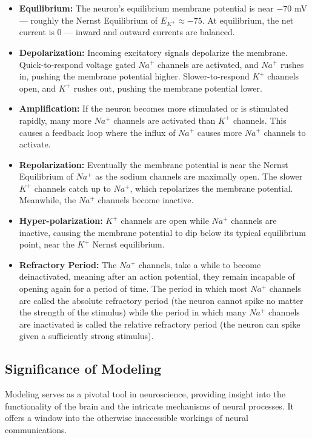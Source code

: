 \documentclass[paper=a4, fontsize=11pt]{scrartcl} %
\numberwithin{equation}{section} %
\numberwithin{figure}{section} %
\numberwithin{table}{section} %
\begin{document}
\begin{itemize}
    \item \textbf{Equilibrium:} The neuron’s equilibrium membrane potential is near \(-70\) mV — roughly the Nernst Equilibrium of \( E_{K^+} \approx -75 \). At equilibrium, the net current is \(0\) — inward and outward currents are balanced.
    \item \textbf{Depolarization:} Incoming excitatory signals depolarize the membrane. Quick-to-respond voltage gated \( Na^+ \) channels are activated, and \( Na^+ \) rushes in, pushing the membrane potential higher. Slower-to-respond \( K^+ \) channels open, and \( K^+ \) rushes out, pushing the membrane potential lower.
    \item \textbf{Amplification:} If the neuron becomes more stimulated or is stimulated rapidly, many more \( Na^+ \) channels are activated than \( K^+ \) channels. This causes a feedback loop where the influx of \( Na^+ \) causes more \( Na^+ \) channels to activate.
    \item \textbf{Repolarization:} Eventually the membrane potential is near the Nernst Equilibrium of \( Na^+ \) as the sodium channels are maximally open. The slower \( K^+ \) channels catch up to \( Na^+ \), which repolarizes the membrane potential. Meanwhile, the \( Na^+ \) channels become inactive.
    \item \textbf{Hyper-polarization:} \( K^+ \) channels are open while \( Na^+ \) channels are inactive, causing the membrane potential to dip below its typical equilibrium point, near the \( K^+ \) Nernst equilibrium.
    \item \textbf{Refractory Period:} The \( Na^+ \) channels, take a while to become deinactivated, meaning after an action potential, they remain incapable of opening again for a period of time. The period in which most \( Na^+ \) channels are called the absolute refractory period (the neuron cannot spike no matter the strength of the stimulus) while the period in which many \( Na^+ \) channels are inactivated is called the relative refractory period (the neuron can spike given a sufficiently strong stimulus).
\end{itemize}













\subsection{Significance of Modeling}
Modeling serves as a pivotal tool in neuroscience, providing insight into the functionality of the brain and the intricate mechanisms of neural processes. It offers a window into the otherwise inaccessible workings of neural communications.
\end{document}
